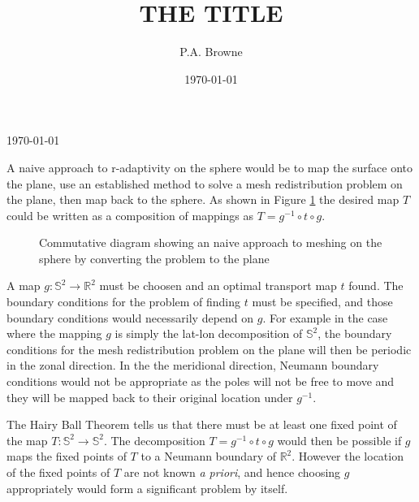 \documentclass{article}
\author[1,*]{P.A. Browne}
\affil[1]{Department of Meteorology, University of Reading, UK}
\affil[*]{Correspondence to p.browne@reading.ac.uk}
\title{THE TITLE}
\date{\today}
\theoremstyle{plain}
\theoremstyle{definition}
\theoremstyle{theorem}
\begin{document}
\linenumbers
{\huge \today}

A naive approach to r-adaptivity on the sphere would be to map the surface onto the plane, use an established method to solve a mesh redistribution problem on the plane, then map back to the sphere. As shown in Figure \ref{commutative_diagram} the desired map $T$ could be written as a composition of mappings as $T = g^{-1} \circ t \circ g$.

\begin{figure}\begin{center}\end{center}\caption{Commutative diagram showing an naive approach to meshing on the sphere by converting the problem to the plane}\label{commutative_diagram}\end{figure}

A map $g: \mathbb{S}^2 \to \mathbb{R}^2$ must be choosen and an optimal transport map $t$ found. The boundary conditions for the problem of finding $t$ must be specified, and those boundary conditions would necessarily depend on $g$. For example in the case where the mapping $g$ is simply the lat-lon decomposition of $\mathbb{S}^2$, the boundary conditions for the mesh redistribution problem on the plane will then be periodic in the zonal direction. In the the meridional direction, Neumann boundary conditions would not be appropriate as the poles will not be free to move and they will be mapped back to their original location under $g^{-1}$. 

The Hairy Ball Theorem tells us that there must be at least one fixed point of the map $T: \mathbb{S}^2 \to \mathbb{S}^2$. The decomposition $T = g^{-1} \circ t \circ g$ would then be possible if $g$ maps the fixed points of $T$ to a Neumann boundary of $\mathbb{R}^2$. However the location of the fixed points of $T$ are not known \textit{a priori}, and hence choosing $g$ appropriately would form a significant problem by itself.





\end{document}

